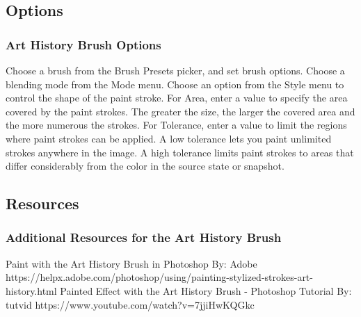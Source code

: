 \documentclass{beamer}
\begin{document}
\subsection{Options}		
\begin{frame}
	\frametitle{Art History Brush Options}
	\begin{outline}
		\1 Choose a brush from the Brush Presets picker, and set brush options.
		\1 Choose a blending mode from the Mode menu. 
		\1 Choose an option from the Style menu to control the shape of the paint stroke.
		\1 For Area, enter a value to specify the area covered by the paint strokes. 
		\2 The greater the size, the larger the covered area and the more numerous the strokes.
		\1 For Tolerance, enter a value to limit the regions where paint strokes can be applied. 
		\2 A low tolerance lets you paint unlimited strokes anywhere in the image. 
		\2 A high tolerance limits paint strokes to areas that differ considerably from the color in the source state or snapshot.
	\end{outline}
\end{frame}

\subsection{Resources}		
\begin{frame}
	\frametitle{Additional Resources for the Art History Brush}
	\begin{outline}
		\1 Paint with the Art History Brush in Photoshop
		\2 By:  Adobe
		\2 https://helpx.adobe.com/photoshop/using/painting-stylized-strokes-art-history.html
		\1 Painted Effect with the Art History Brush - Photoshop Tutorial
		\2 By:  tutvid
		\2 https://www.youtube.com/watch?v=7jjiHwKQGkc
	\end{outline}
\end{frame}
	
\end{document}
